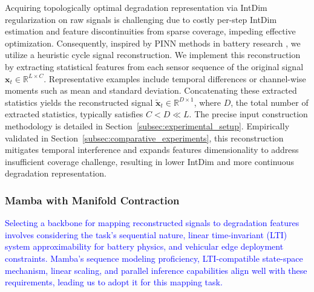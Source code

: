 \documentclass[lettersize,journal]{IEEEtran}
\newcommand{\rev}[1]{\textcolor{blue}{#1}}
\begin{document}
Acquiring topologically optimal degradation representation via IntDim regularization on raw signals is challenging due to costly per-step IntDim estimation and feature discontinuities from sparse coverage, impeding effective optimization. Consequently, inspired by PINN methods in battery research \cite{wang2024physics, 10251604}, we utilize a heuristic cycle signal reconstruction.
We implement this reconstruction by extracting statistical features from each sensor sequence of the original signal $\boldsymbol{x}_{t} \in \mathbb{R} ^ {L \times C}$. 
Representative examples include temporal differences or channel-wise moments such as mean and standard deviation. Concatenating these extracted statistics yields the reconstructed signal $\boldsymbol{\widetilde{x}}_{t} \in \mathbb{R} ^ {D \times 1}$, where $D$, the total number of extracted statistics, typically satisfies $C < D \ll L$. The precise input construction methodology is detailed in Section~\ref{subsec:experimental_setup}.
Empirically validated in Section~\ref{subsec:comparative_experiments}, this reconstruction mitigates temporal interference and expands features dimensionality to address insufficient coverage challenge, resulting in lower IntDim and more continuous degradation representation.

\subsubsection{Mamba with Manifold Contraction}

\rev{Selecting a backbone for mapping reconstructed signals to degradation features involves considering the task's sequential nature, linear time-invariant (LTI) system approximability for battery physics, and vehicular edge deployment constraints. Mamba's sequence modeling proficiency, LTI-compatible state-space mechanism, linear scaling, and parallel inference capabilities \cite{gu2024mamba} align well with these requirements, leading us to adopt it for this mapping task.}
\end{document}
